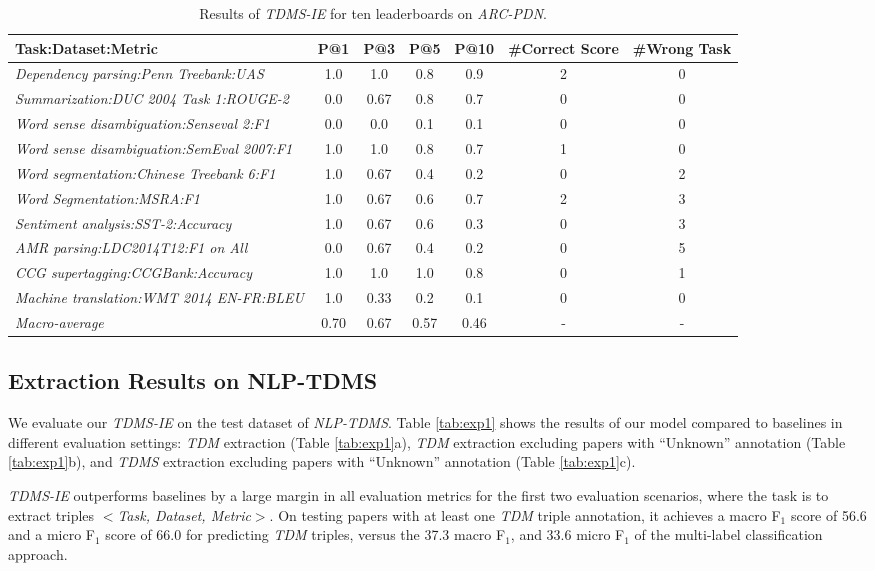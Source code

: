 \documentclass[11pt,a4paper]{article}
\begin{document}
\begin{table*}
\begin{center}
\small
\begin{tabular}{l cccc cc }
\hline
Task:Dataset:Metric& P@1&P@3&P@5&P@10&\#Correct Score&\#Wrong Task\\ \hline
\emph{Dependency parsing:Penn Treebank:UAS}&1.0&1.0&0.8&0.9&2&0 \\
\emph{Summarization:DUC 2004 Task 1:ROUGE-2}&0.0&0.67&0.8&0.7&0&0 \\
\emph{Word sense disambiguation:Senseval 2:F1}&0.0&0.0&0.1&0.1&0&0 \\
\emph{Word sense disambiguation:SemEval 2007:F1}&1.0&1.0&0.8&0.7&1&0 \\
\emph{Word segmentation:Chinese Treebank 6:F1}&1.0&0.67&0.4&0.2&0&2 \\
\emph{Word Segmentation:MSRA:F1}&1.0&0.67&0.6&0.7&2&3 \\
\emph{Sentiment analysis:SST-2:Accuracy}&1.0&0.67&0.6&0.3&0&3 \\
\emph{AMR parsing:LDC2014T12:F1 on All}&0.0&0.67&0.4&0.2&0&5 \\
\emph{CCG supertagging:CCGBank:Accuracy}&1.0&1.0&1.0&0.8&0&1 \\
\emph{Machine translation:WMT 2014 EN-FR:BLEU}&1.0&0.33&0.2&0.1&0&0 \\ \hline
\emph{Macro-average}&0.70&0.67&0.57&0.46&-&- \\

 \hline
\end{tabular}
\end{center}
\caption{\label{tab:exp2}  Results of \emph{TDMS-IE}  for ten leaderboards  on  \emph{ARC-PDN}.}
\end{table*}

\subsection{Extraction Results on NLP-TDMS}\label{sec:nlptdes_results}
We evaluate our \emph{TDMS-IE} on the test dataset of \emph{NLP-TDMS}.
Table \ref{tab:exp1} shows the results of our model compared to baselines in different 
evaluation settings: \emph{TDM} extraction (Table \ref{tab:exp1}a), \emph{TDM} extraction excluding papers with ``Unknown'' annotation (Table \ref{tab:exp1}b), and \emph{TDMS} extraction excluding papers with ``Unknown'' annotation (Table \ref{tab:exp1}c).

\emph{TDMS-IE} outperforms baselines by a large margin in all evaluation metrics for the first two evaluation scenarios, where the task is to extract triples $<$\emph{Task, Dataset, Metric}$>$. On testing papers with at least one \emph{TDM} triple annotation, it achieves a macro F$_1$ score of 56.6 and a micro F$_1$ score of 66.0 for predicting \emph{TDM} triples, versus the 37.3 macro F$_1$, and 33.6 micro F$_1$ of the multi-label classification approach.
\end{document}
